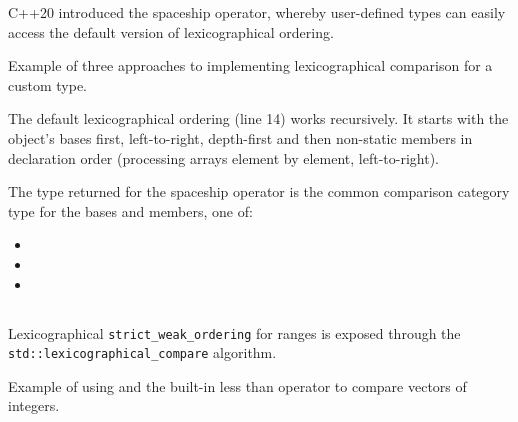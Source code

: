 C++20 introduced the spaceship operator, whereby user-defined types can easily access the default version of lexicographical ordering.

\begin{codebox}[breakable]{\href{https://compiler-explorer.com/z/7PjY8fc1G}{\ExternalLink}}
\footnotesize Example of three approaches to implementing lexicographical comparison for a custom type.
\tcblower
{}
\end{codebox}

The default lexicographical ordering (line 14) works recursively. It starts with the object’s bases first, left-to-right, depth-first and then non-static members in declaration order (processing arrays element by element, left-to-right).

The type returned for the spaceship operator is the common comparison category type for the bases and members, one of:
\begin{itemize}
    \item {}
    \item {}
    \item {}
\end{itemize}

\subsection{\texorpdfstring{}{\texttt{std::lexicographical\_compare}}}

Lexicographical \texttt{strict\_weak\_ordering} for ranges is exposed through the \newline\texttt{std::lexicographical\_compare} algorithm.



\begin{codebox}[breakable]{\href{https://compiler-explorer.com/z/YGW4ET1oa}{\ExternalLink}}
\footnotesize Example of using  and the built-in less than operator to compare vectors of integers.
\tcblower
{}
\end{codebox}

